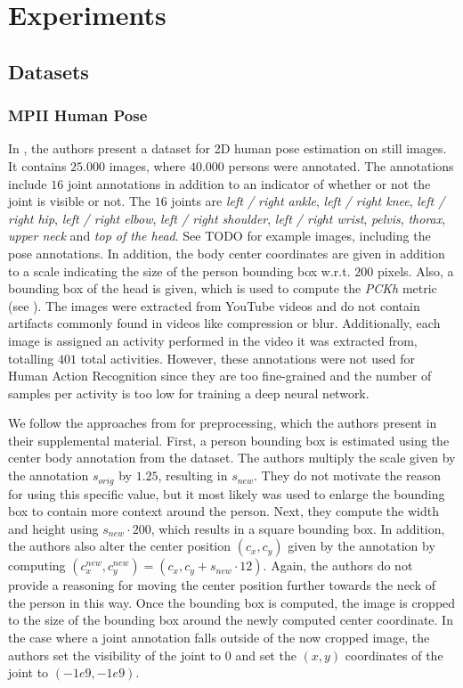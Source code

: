 \chapter{Experiments}

\section{Datasets}
\label{sec:exp-datasets}

\subsection{MPII Human Pose}
\label{sec:exp-mpii}

In \cite{andriluka_2d_2014}, the authors present a dataset for 2D human pose estimation on still images.
It contains $25.000$ images, where $40.000$ persons were annotated.
The annotations include $16$ joint annotations in addition to an indicator of whether or not the joint is visible or not.
The $16$ joints are \textit{left / right ankle}, \textit{left / right knee}, \textit{left / right hip}, \textit{left / right elbow}, \textit{left / right shoulder}, \textit{left / right wrist}, \textit{pelvis}, \textit{thorax}, \textit{upper neck} and \textit{top of the head}.
See TODO for example images, including the pose annotations.
In addition, the body center coordinates are given in addition to a scale indicating the size of the person bounding box w.r.t. $200$ pixels.
Also, a bounding box of the head is given, which is used to compute the \textit{PCKh} metric (see ).
The images were extracted from YouTube videos and do not contain artifacts commonly found in videos like compression or blur.
Additionally, each image is assigned an activity performed in the video it was extracted from, totalling $401$ total activities.
However, these annotations were not used for Human Action Recognition since they are too fine-grained and the number of samples per activity is too low for training a deep neural network.

We follow the approaches from \cite{luvizon_2d/3d_2018} for preprocessing, which the authors present in their supplemental material.
First, a person bounding box is estimated using the center body annotation from the dataset.
The authors multiply the scale given by the annotation $s_{orig}$ by $1.25$, resulting in $s_{new}$.
They do not motivate the reason for using this specific value, but it most likely was used to enlarge the bounding box to contain more context around the person.
Next, they compute the width and height using $s_{new} \cdot 200$, which results in a square bounding box.
In addition, the authors also alter the center position $(c_x,  c_y)$ given by the annotation by computing $(c_{x}^{new}, c_y^{new}) = (c_x, c_y + s_{new} \cdot 12)$.
Again, the authors do not provide a reasoning for moving the center position further towards the neck of the person in this way.
Once the bounding box is computed, the image is cropped to the size of the bounding box around the newly computed center coordinate.
In the case where a joint annotation falls outside of the now cropped image, the authors set the visibility of the joint to $0$ and set the $(x,y)$ coordinates of the joint to $(-1e9, -1e9)$.

